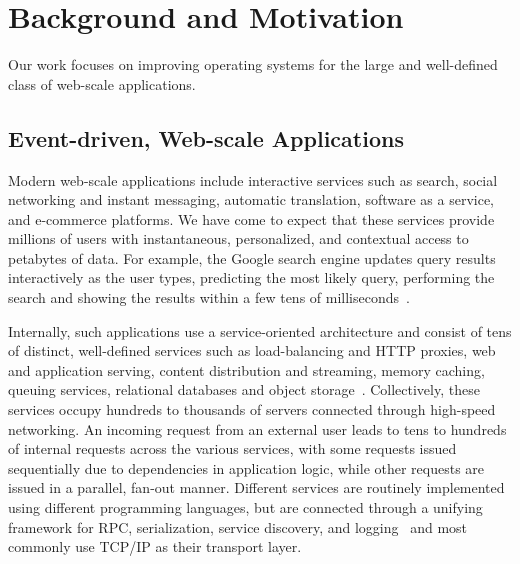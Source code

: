 
\section{Background and Motivation}
\label{sec:motivation}

Our work focuses on improving operating systems for the large and
well-defined class of web-scale applications. 

\subsection{Event-driven, Web-scale Applications}
\label{sec:motivation:web}

Modern web-scale applications include interactive services such as
search, social networking and instant messaging, automatic
translation, software as a service, and e-commerce platforms.
We have come to expect that these services provide millions of users
with instantaneous, personalized, and contextual access to petabytes
of data.  For example, the Google search engine updates query results
interactively as the user types, predicting the most likely query,
performing the search and showing the results within a few tens of
milliseconds~\cite{DBLP:journals/cacm/DeanB13}.

Internally, such applications use a service-oriented architecture and
consist of tens of distinct, well-defined services such as
load-balancing and HTTP proxies, web and application serving, content
distribution and streaming, memory caching, queuing services,
relational databases and object
storage~\cite{Alonso:2010:WSC,DBLP:conf/sosp/DeCandiaHJKLPSVV07,Eriksen:2013:YSF}.
Collectively, these services occupy hundreds to thousands of servers
connected through high-speed networking. An incoming request from an
external user leads to tens to hundreds of internal requests across
the various services, with some requests issued sequentially due to
dependencies in application logic, while other requests are issued in
a parallel, fan-out manner.  Different services are routinely
implemented using different programming languages, but are connected
through a unifying framework for RPC, serialization, service
discovery, and logging~\cite{finagle, protocolbuffers, thrift} and most commonly use TCP/IP as their transport
layer.


